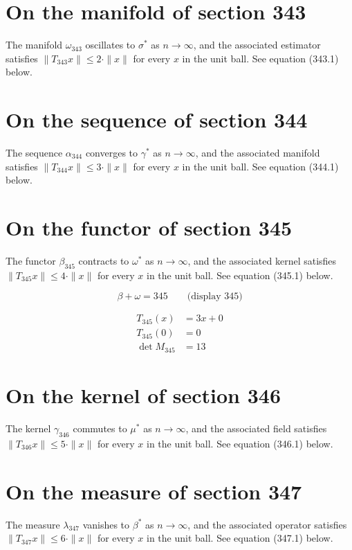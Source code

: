 \documentclass{article}
\begin{document}
\section{On the manifold of section 343}
The manifold $\omega_{343}$ oscillates to $\sigma^{*}$ as $n \to \infty$,
and the associated estimator satisfies $\|T_{343} x\| \leq 2 \cdot \|x\|$
for every $x$ in the unit ball. See equation (343.1) below.

\section{On the sequence of section 344}
The sequence $\alpha_{344}$ converges to $\gamma^{*}$ as $n \to \infty$,
and the associated manifold satisfies $\|T_{344} x\| \leq 3 \cdot \|x\|$
for every $x$ in the unit ball. See equation (344.1) below.

\section{On the functor of section 345}
The functor $\beta_{345}$ contracts to $\omega^{*}$ as $n \to \infty$,
and the associated kernel satisfies $\|T_{345} x\| \leq 4 \cdot \|x\|$
for every $x$ in the unit ball. See equation (345.1) below.

$$
\beta + \omega = 345 \qquad \text{(display 345)}
$$

\begin{align}
T_{345}(x) &= 3 x + 0 \\
T_{345}(0) &= 0 \\
\det M_{345} &= 13
\end{align}

\section{On the kernel of section 346}
The kernel $\gamma_{346}$ commutes to $\mu^{*}$ as $n \to \infty$,
and the associated field satisfies $\|T_{346} x\| \leq 5 \cdot \|x\|$
for every $x$ in the unit ball. See equation (346.1) below.

\section{On the measure of section 347}
The measure $\lambda_{347}$ vanishes to $\beta^{*}$ as $n \to \infty$,
and the associated operator satisfies $\|T_{347} x\| \leq 6 \cdot \|x\|$
for every $x$ in the unit ball. See equation (347.1) below.
\end{document}
